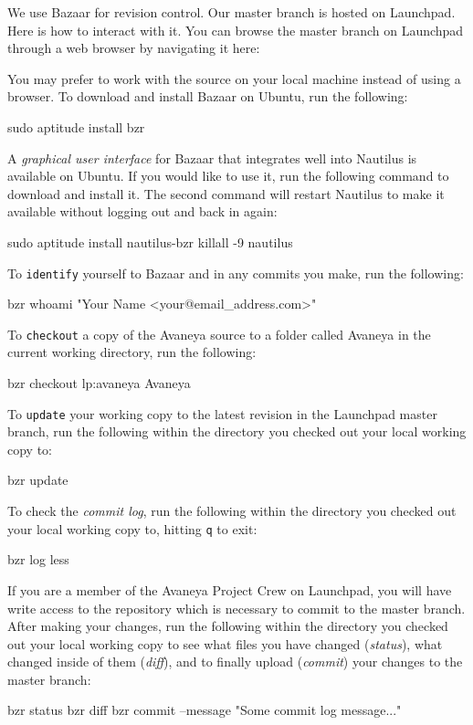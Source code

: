 
We use Bazaar for revision control. Our master branch is hosted on Launchpad. Here is how to interact with it. You can browse the master branch on Launchpad through a web browser by navigating it here:


You may prefer to work with the source on your local machine instead of using a browser. To download and install Bazaar on Ubuntu, run the following:

\startCodeExample
\type{$} sudo aptitude install bzr
\stopCodeExample

A {\it graphical user interface} for Bazaar that integrates well into Nautilus is available on Ubuntu. If you would like to use it, run the following command to download and install it. The second command will restart Nautilus to make it available without logging out and back in again:

\startCodeExample
\type{$} sudo aptitude install nautilus-bzr
\type{$} killall -9 nautilus
\stopCodeExample

To {\tt identify} yourself to Bazaar and in any commits you make, run the following:

\startCodeExample
\type{$} bzr whoami "Your Name <your@email_address.com>"
\stopCodeExample

To {\tt checkout} a copy of the Avaneya source to a folder called Avaneya in the current working directory, run the following:

\startCodeExample
\type{$} bzr checkout lp:avaneya Avaneya
\stopCodeExample

To {\tt update} your working copy to the latest revision in the Launchpad master branch, run the following within the directory you checked out your local working copy to:

\startCodeExample
\type{$} bzr update
\stopCodeExample

To check the {\it commit log}, run the following within the directory you checked out your local working copy to, hitting {\tt q} to exit:

\startCodeExample
\type{$} bzr log \type{|} less
\stopCodeExample

If you are a member of the Avaneya Project Crew on Launchpad, you will have write access to the repository which is necessary to commit to the master branch. After making your changes, run the following within the directory you checked out your local working copy to see what files you have changed ({\it status}), what changed inside of them ({\it diff}), and to finally upload ({\it commit}) your changes to the master branch:

\startCodeExample
\type{$} bzr status
\type{$} bzr diff
\type{$} bzr commit --message "Some commit log message..."
\stopCodeExample

